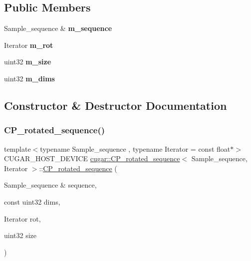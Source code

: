 \subsection*{Public Members}
\begin{DoxyCompactItemize}
\item 
\mbox{\label{structcugar_1_1_c_p__rotated__sequence_ae89cb3ff2b68c56e67e0d8801871602e}} 
Sample\+\_\+sequence \& {\bfseries m\+\_\+sequence}
\item 
\mbox{\label{structcugar_1_1_c_p__rotated__sequence_a13ce8bb76ae49fb10b4ab685945ff403}} 
Iterator {\bfseries m\+\_\+rot}
\item 
\mbox{\label{structcugar_1_1_c_p__rotated__sequence_ad441ef2dde3c643f1c96a04ebb99b580}} 
uint32 {\bfseries m\+\_\+size}
\item 
\mbox{\label{structcugar_1_1_c_p__rotated__sequence_a89d9b172106c9693abb1bde2eabd6da0}} 
uint32 {\bfseries m\+\_\+dims}
\end{DoxyCompactItemize}


\subsection{Constructor \& Destructor Documentation}
\mbox{\label{structcugar_1_1_c_p__rotated__sequence_a89118c80f2c2e00189cc2c1f130e29c2}} 
\subsubsection{\texorpdfstring{C\+P\+\_\+rotated\+\_\+sequence()}{CP\_rotated\_sequence()}}
{\footnotesize\ttfamily template$<$typename Sample\+\_\+sequence , typename Iterator  = const float$\ast$$>$ \\
C\+U\+G\+A\+R\+\_\+\+H\+O\+S\+T\+\_\+\+D\+E\+V\+I\+CE \hyperlink{structcugar_1_1_c_p__rotated__sequence}{cugar\+::\+C\+P\+\_\+rotated\+\_\+sequence}$<$ Sample\+\_\+sequence, Iterator $>$\+::\hyperlink{structcugar_1_1_c_p__rotated__sequence}{C\+P\+\_\+rotated\+\_\+sequence} (\begin{DoxyParamCaption}\item[{Sample\+\_\+sequence \&}]{sequence,  }\item[{const uint32}]{dims,  }\item[{Iterator}]{rot,  }\item[{uint32}]{size }\end{DoxyParamCaption})\hspace{0.3cm}{\ttfamily [inline]}}

